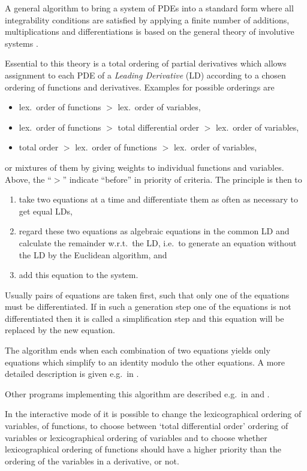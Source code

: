 A general algorithm to bring a system of PDEs into a standard form
where all integrability conditions are satisfied by applying a finite
number of additions, multiplications and differentiations is based on
the general theory of involutive systems \cite{Riquier:1910,
  Thomas:1937, Janet:1929}.

Essential to this theory is a total ordering of partial derivatives
which allows assignment to each PDE of a \emph{Leading Derivative}
(LD) according to a chosen ordering of functions and derivatives.
Examples for possible orderings are
\begin{itemize}
\item lex.\ order of functions $>$ lex.\ order of variables,
\item lex.\ order of functions $>$ total differential order $>$
  lex.\ order of variables,
\item total order $>$ lex.\ order of functions $>$ lex.\ order of
  variables,
\end{itemize}
or mixtures of them by giving weights to individual functions and
variables.  Above, the ``$>$'' indicate ``before'' in priority of
criteria.  The principle is then to
\begin{enumerate}
\item take two equations at a time and differentiate them as
  often as necessary to get equal LDs,
\item regard these two equations as algebraic equations in the
  common LD and calculate the remainder w.r.t.\ the LD, i.e.\ to
  generate an equation without the LD by the Euclidean algorithm, and
\item add this equation to the system.
\end{enumerate}
Usually pairs of equations are taken first, such that only one of the
equations must be differentiated.  If in such a generation step one of
the equations is not differentiated then it is called a simplification
step and this equation will be replaced by the new equation.

The algorithm ends when each combination of two equations yields only
equations which simplify to an identity modulo the other equations.  A
more detailed description is given e.g.\ in \cite{Bocharov:89,
  Reid:90}.

Other programs implementing this algorithm are described e.g.\ in
\cite{Schwarz:1985, Bocharov:89, Fushchich:89, Reid:90,
  Reid_Wittkopf_Boulton:1996, Reid_Lin_Wittkopf:2001} and
\cite{Mansfield:1996}.

In the interactive mode of  it is possible to change
the lexicographical ordering of variables, of functions, to choose
between `total differential order' ordering of variables or
lexicographical ordering of variables and to choose whether
lexicographical ordering of functions should have a higher priority
than the ordering of the variables in a derivative, or not.

